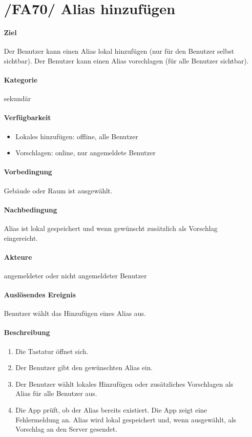 \section{/FA70/ Alias hinzufügen}
\label{/FA70/}
\paragraph{Ziel}
Der Benutzer kann einen Alias lokal hinzufügen (nur für den Benutzer selbst sichtbar). Der Benutzer kann einen Alias vorschlagen (für alle Benutzer sichtbar).
\paragraph{Kategorie}
sekundär
\paragraph{Verfügbarkeit}
\begin{itemize}
    \item Lokales hinzufügen: offline, alle Benutzer
    \item Vorschlagen: online, nur angemeldete Benutzer
\end{itemize}

\paragraph{Vorbedingung}
Gebäude oder Raum ist ausgewählt.
\paragraph{Nachbedingung}
Alias ist lokal gespeichert und wenn gewünscht zusätzlich als Vorschlag eingereicht.
\paragraph{Akteure}
angemeldeter oder nicht angemeldeter Benutzer
\paragraph{Auslösendes Ereignis}
Benutzer wählt das Hinzufügen eines Alias aus.
\paragraph{Beschreibung}
\begin{enumerate}
    \item Die Tastatur öffnet sich.
    \item Der Benutzer gibt den gewünschten Alias ein.
    \item Der Benutzer wählt lokales Hinzufügen oder zusätzliches Vorschlagen als Alias für alle Benutzer aus.
    \item Die App prüft, ob der Alias bereits existiert.
     Die App zeigt eine Fehlermeldung an.
     Alias wird lokal gespeichert und, wenn ausgewählt, als Vorschlag an den Server gesendet.
\end{enumerate}
